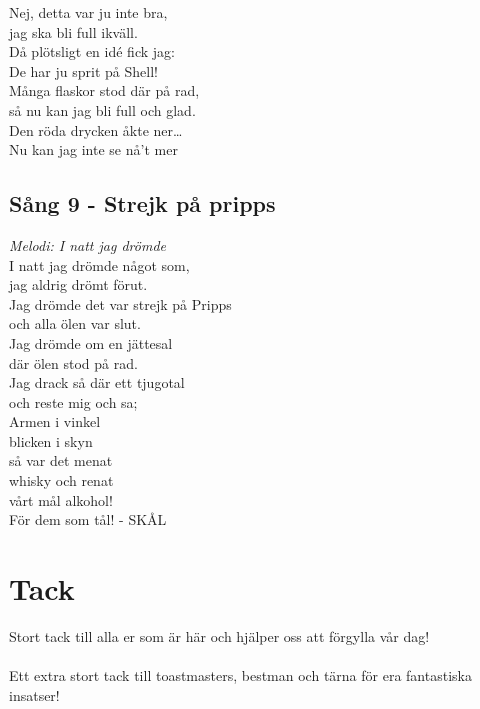 \documentclass[a5paper]{article}
\begin{document}
\noindent
Nej, detta var ju inte bra, \\
jag ska bli full ikväll. \\
Då plötsligt en idé fick jag: \\
De har ju sprit på Shell! \\
Många flaskor stod där på rad, \\
så nu kan jag bli full och glad. \\
Den röda drycken åkte ner… \\
Nu kan jag inte se nå’t mer	\\
	
\subsection{Sång 9 - Strejk på pripps}
\textit{Melodi: I natt jag drömde}\\

\noindent
I natt jag drömde något som,\\
jag aldrig drömt förut.\\ 
Jag drömde det var strejk på Pripps\\
och alla ölen var slut.\\
Jag drömde om en jättesal\\
där ölen stod på rad.\\
Jag drack så där ett tjugotal\\
och reste mig och sa;\\

\noindent
Armen i vinkel\\
blicken i skyn\\
så var det menat\\
whisky och renat\\
vårt mål alkohol!\\
För dem som tål! - SKÅL\\
\newpage


\section{Tack}
Stort tack till alla er som är här och hjälper oss att förgylla vår dag! \\ \\
Ett extra stort tack till toastmasters, bestman och tärna för era fantastiska insatser!
\end{document}
